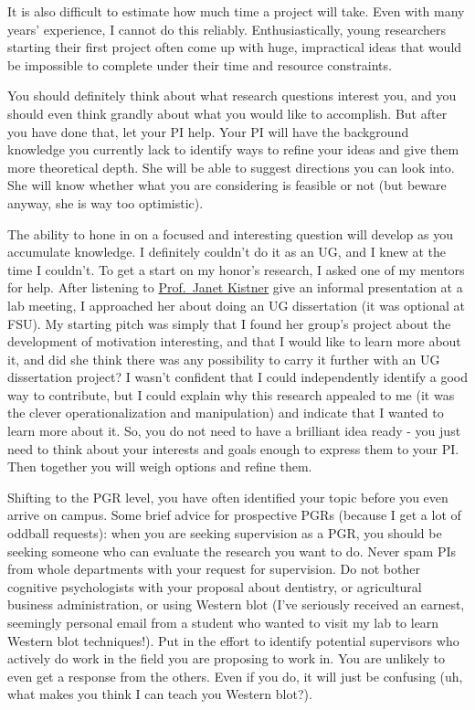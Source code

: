 \documentclass[12pt,]{book}
\theoremstyle{definition}
\theoremstyle{definition}
\theoremstyle{definition}
\theoremstyle{remark}
\begin{document}
It is also difficult to estimate how much time a project will take. Even
with many years' experience, I cannot do this reliably.
Enthusiastically, young researchers starting their first project often
come up with huge, impractical ideas that would be impossible to
complete under their time and resource constraints.

You should definitely think about what research questions interest you,
and you should even think grandly about what you would like to
accomplish. But after you have done that, let your PI help. Your PI will
have the background knowledge you currently lack to identify ways to
refine your ideas and give them more theoretical depth. She will be able
to suggest directions you can look into. She will know whether what you
are considering is feasible or not (but beware anyway, she is way too
optimistic).

The ability to hone in on a focused and interesting question will
develop as you accumulate knowledge. I definitely couldn't do it as an
UG, and I knew at the time I couldn't. To get a start on my honor's
research, I asked one of my mentors for help. After listening to
\href{https://psy.fsu.edu/faculty/kistnerj/kistner.dp.php}{Prof.~Janet
Kistner} give an informal presentation at a lab meeting, I approached
her about doing an UG dissertation (it was optional at FSU). My starting
pitch was simply that I found her group's project about the development
of motivation interesting, and that I would like to learn more about it,
and did she think there was any possibility to carry it further with an
UG dissertation project? I wasn't confident that I could independently
identify a good way to contribute, but I could explain why this research
appealed to me (it was the clever operationalization and manipulation)
and indicate that I wanted to learn more about it. So, you do not need
to have a brilliant idea ready - you just need to think about your
interests and goals enough to express them to your PI. Then together you
will weigh options and refine them.

Shifting to the PGR level, you have often identified your topic before
you even arrive on campus. Some brief advice for prospective PGRs
(because I get a lot of oddball requests): when you are seeking
supervision as a PGR, you should be seeking someone who can evaluate the
research you want to do. Never spam PIs from whole departments with your
request for supervision. Do not bother cognitive psychologists with your
proposal about dentistry, or agricultural business administration, or
using Western blot (I've seriously received an earnest, seemingly
personal email from a student who wanted to visit my lab to learn
Western blot techniques!). Put in the effort to identify potential
supervisors who actively do work in the field you are proposing to work
in. You are unlikely to even get a response from the others. Even if you
do, it will just be confusing (uh, what makes you think I can teach you
Western blot?).
\end{document}
